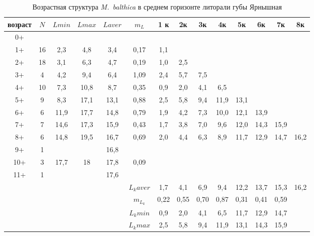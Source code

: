 \begin{landscape}
\begin{table}[h]
\caption{Возрастная структура {\it M.~balthica} в среднем горизонте литорали губы Ярнышная}
\label{tab:Yarnyshnaya_sgl_growth_matrix}
\begin{tabular}{|c|c|cc|cc|cccccccc|}
    \hline
возраст & $N$  & $L min$ & $L max$ & $L aver$ & $m_L$   & 1 к  & 2к   & 3к   & 4к   & 5к   & 6к   & 7к   & 8к   \\ \hline
0+      &    &       &       &         &         &      &      &      &      &      &      &      &      \\
1+      & 16 & 2,3   & 4,8   & 3,4     & 0,17    & 1,1  &      &      &      &      &      &      &      \\
2+      & 18 & 3,1   & 6,3   & 4,7     & 0,19    & 1,0  & 2,5  &      &      &      &      &      &      \\
3+      & 4  & 4,2   & 9,4   & 6,4     & 1,09    & 2,4  & 5,7  & 7,5  &      &      &      &      &      \\
4+      & 10 & 7,3   & 10,8  & 8,7     & 0,35    & 0,9  & 2,0  & 4,1  & 6,5  &      &      &      &      \\
5+      & 9  & 8,3   & 17,1  & 13,1    & 0,88    & 2,5  & 5,8  & 9,4  & 11,9 & 13,1 &      &      &      \\
6+      & 6  & 11,9  & 17,7  & 14,8    & 0,79    & 1,9  & 4,2  & 7,3  & 10,0 & 12,1 & 13,9 &      &      \\
7+      & 7  & 14,6  & 17,3  & 15,9    & 0,43    & 1,7  & 3,8  & 7,0  & 9,6  & 12,0 & 14,3 & 15,9 &      \\
8+      & 6  & 14,8  & 19,5  & 16,7    & 0,69    & 2,0  & 4,4  & 6,3  & 8,9  & 11,7 & 12,9 & 14,7 & 16,2 \\
9+      & 1  &     &     & 16,8    &         &    &    &    &    &    &    &    &    \\
10+     & 3  & 17,7  & 18    & 17,8    & 0,09    &    &    &    &    &    &    &    &    \\
11+     & 1  &     &     & 17,6    &         &    &    &    &    &    &    &    &    \\ \hline
        &    &       &       &         & $L_k aver$ & 1,7  & 4,1  & 6,9  & 9,4  & 12,2 & 13,7 & 15,3 & 16,2 \\
        &    &       &       &         & $m_{L_k}$  & 0,22 & 0,55 & 0,70 & 0,87 & 0,31 & 0,41 & 0,59 &      \\
        &    &       &       &         & $L_k min$  & 0,9  & 2,0  & 4,1  & 6,5  & 11,7 & 12,9 & 14,7 &    \\
        &    &       &       &         & $L_k max$  & 2,5  & 5,8  & 9,4  & 11,9 & 13,1 & 14,3 & 15,9 &    \\ \hline
\end{tabular}
\end{table}


\end{landscape}
